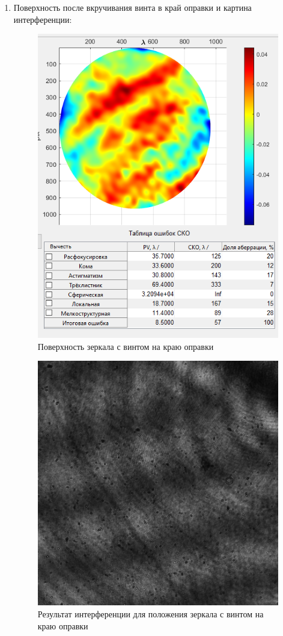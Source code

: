 \documentclass[a4paper, 12pt]{article}%
\begin{document}
\begin{enumerate}
		\newpage
		
		\item Поверхность после вкручивания винта в край оправки и картина интерференции:
		
		\begin{figure}[H]
			\centering
			\includegraphics[width=0.9\linewidth]{3ex.png}
			\caption{Поверхность зеркала с винтом на краю оправки}
		\end{figure}
		
		\begin{figure}[H]
			\centering
			\includegraphics[width=0.9\linewidth]{3ex-lines}
			\caption{Результат интерференции для положения зеркала с винтом на краю оправки}
		\end{figure}
		

\end{enumerate}
\end{document}
